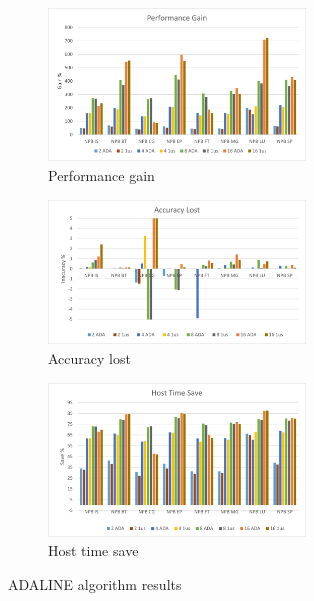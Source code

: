 \begin{figure}[]
\centering
\begin{subfigure}{\textwidth}
    \centering
    \includegraphics[width=0.75\textwidth]{Images/Performance_ADA.png}
    \caption{ Performance gain}
    \label{fig:Performance_ADA}
\end{subfigure}
\begin{subfigure}{\textwidth}
    \centering
    \includegraphics[width=0.75\textwidth]{Images/Accuracy_ADA.png}
    \caption{ Accuracy lost}
    \label{fig:Accuracy_ADA}
\end{subfigure}
\begin{subfigure}{\textwidth}
    \centering
    \includegraphics[width=0.75\textwidth]{Images/Host_ADA.png}
    \caption{ Host time save}
    \label{fig:Host_ADA}
\end{subfigure}
        
\caption{ADALINE algorithm results}
\label{fig:results_ADA}
\end{figure}

